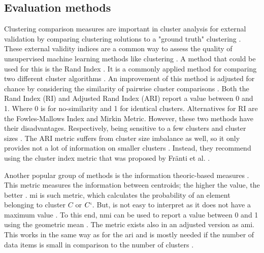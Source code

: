 \subsection{Evaluation methods} \label{theory:evaluate}
Clustering comparison measures are important in cluster analysis for external validation by comparing clustering solutions to a "ground truth" clustering \citep{vinh_information_nodate}.
These external validity indices are a common way to assess the quality of unsupervised machine learning methods like clustering \citep{warrens_understanding_2022}.
A method that could be used for this is the Rand Index \citep{rand_objective_1971}.
It is a commonly applied method for comparing two different cluster algorithms \citep{wagner_comparing_nodate}.
An improvement of this method is adjusted for chance by considering the similarity of pairwise cluster comparisons \citep{vinh_information_nodate}.
Both the Rand Index (RI) and Adjusted Rand Index (ARI) \citep{hubert_comparing_1985} report a value between 0 and 1.
Where 0 is for no-similarity and 1 for identical clusters.
Alternatives for RI are the Fowles-Mallows Index and Mirkin Metric.
However, these two methods have their disadvantages. Respectively, being sensitive to a few clusters and cluster sizes \citep{wagner_comparing_nodate}.
The ARI metric suffers from cluster size imbalance as well, so it only provides not a lot of information on smaller clusters \citep{warrens_understanding_2022}.
Instead, they recommend using the cluster index metric that was proposed by Fränti et al. \citep{franti_centroid_2014}.

Another popular group of methods is the information theoric-based measures \citep{vinh_information_nodate}.
This metric measures the information between centroids; the higher the value, the better \citep{vinh_information_nodate}.
\gls{mi} is such metric, which calculates the probability of an element belonging to cluster $C$ or $C`$.
But, is not easy to interpret as it does not have a maximum value \citep{wagner_comparing_nodate}.
To this end, \gls{nmi} can be used to report a value between 0 and 1 using the geometric mean \citep{strehl_cluster_2002}.
The metric exists also in an adjusted version as \gls{ami}.
This works in the same way as for the \gls{ari} and is mostly needed if the number of data items is small in comparison to the number of clusters \citep{vinh_information_nodate}. \newline

